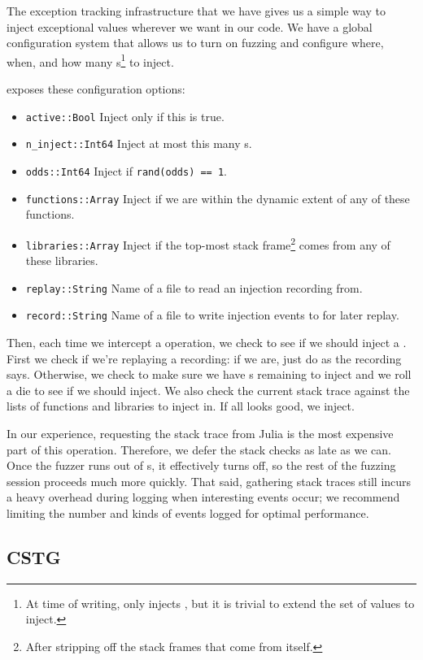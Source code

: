 \documentclass{juliacon}
\begin{document}
The exception tracking infrastructure that we have gives us a simple way to inject exceptional values wherever we want in our code.
We have a global configuration system that allows us to turn on fuzzing and configure where, when, and how many \NaN{}s\footnote{At time of writing, \FT{} only injects \NaN{}, but it is trivial to extend the set of values to inject.} to inject.

\FT{} exposes these configuration options:

\begin{itemize}
\item \texttt{active::Bool} Inject only if this is true.
\item \texttt{n\_inject::Int64} Inject at most this many \NaN{}s.
\item \texttt{odds::Int64} Inject if \texttt{rand(odds) == 1}.
\item \texttt{functions::Array} Inject if we are within the dynamic extent of any of these functions.
\item \texttt{libraries::Array} Inject if the top-most stack frame\footnote{After stripping off the stack frames that come from \FT{} itself.} comes from any of these libraries.
\item \texttt{replay::String} Name of a file to read an injection recording from.
\item \texttt{record::String} Name of a file to write injection events to for later replay.
\end{itemize}

Then, each time we intercept a \fp{} operation, we check to see if we should inject a \NaN{}. First we check if we're replaying a recording: if we are, just do as the recording says. Otherwise, we check to make sure we have \NaN{}s remaining to inject and we roll a die to see if we should inject. We also check the current stack trace against the lists of functions and libraries to inject in. If all looks good, we inject.

In our experience, requesting the stack trace from Julia is the most expensive part of this operation.
Therefore, we defer the stack checks as late as we can.
Once the fuzzer runs out of \NaN{}s, it effectively turns off, so the rest of the fuzzing session proceeds much more quickly.
That said, gathering stack traces still incurs a heavy overhead during logging when interesting events occur;
we recommend limiting the number and kinds of events logged for optimal performance.

\subsection{CSTG}
\label{s:cstg}
\end{document}
